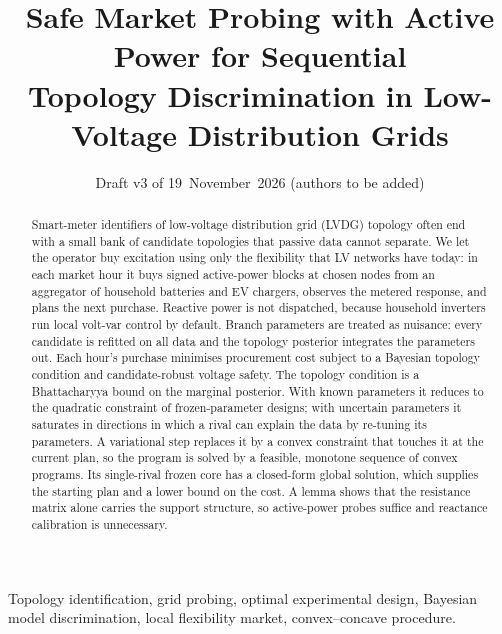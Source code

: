 \documentclass[journal,onecolumn,11pt]{IEEEtran}
\begin{document}
\title{Safe Market Probing with Active Power for Sequential\\ Topology Discrimination in Low-Voltage Distribution Grids}
\author{Draft v3 of 19~November~2026 (authors to be added)}
\maketitle

\begin{abstract}
Smart-meter identifiers of low-voltage distribution grid (LVDG) topology often end with a small bank of candidate topologies that passive data cannot separate. We let the operator buy excitation using only the flexibility that LV networks have today: in each market hour it buys signed active-power blocks at chosen nodes from an aggregator of household batteries and EV chargers, observes the metered response, and plans the next purchase. Reactive power is not dispatched, because household inverters run local volt-var control by default. Branch parameters are treated as nuisance: every candidate is refitted on all data and the topology posterior integrates the parameters out. Each hour's purchase minimises procurement cost subject to a Bayesian topology condition and candidate-robust voltage safety. The topology condition is a Bhattacharyya bound on the marginal posterior. With known parameters it reduces to the quadratic constraint of frozen-parameter designs; with uncertain parameters it saturates in directions in which a rival can explain the data by re-tuning its parameters. A variational step replaces it by a convex constraint that touches it at the current plan, so the program is solved by a feasible, monotone sequence of convex programs. Its single-rival frozen core has a closed-form global solution, which supplies the starting plan and a lower bound on the cost. A lemma shows that the resistance matrix alone carries the support structure, so active-power probes suffice and reactance calibration is unnecessary.
\end{abstract}

\begin{IEEEkeywords}
Topology identification, grid probing, optimal experimental design, Bayesian model discrimination, local flexibility market, convex--concave procedure.
\end{IEEEkeywords}

\end{document}
